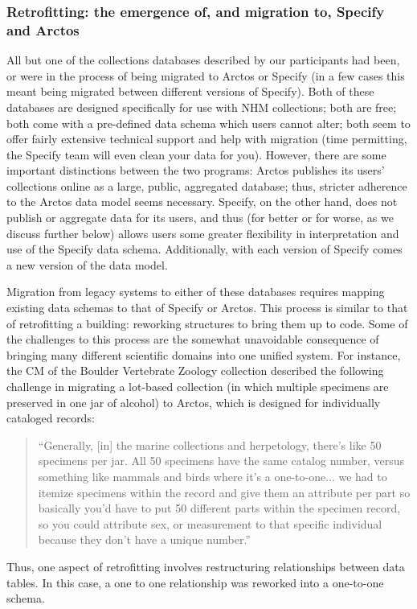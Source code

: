 \subsubsection{Retrofitting: the emergence of, and migration to, Specify and Arctos}

All but one of the collections databases described by our participants had been, or were in the process of being migrated to Arctos or Specify (in a few cases this meant being migrated between different versions of Specify). Both of these databases are designed specifically for use with NHM collections; both are free; both come with a pre-defined data schema which users cannot alter; both seem to offer fairly extensive technical support and help with migration (time permitting, the Specify team will even clean your data for you). However, there are some important distinctions between the two programs: Arctos publishes its users’ collections online as a large, public, aggregated database; thus, stricter adherence to the Arctos data model seems necessary. Specify, on the other hand, does not publish or aggregate data for its users, and thus (for better or for worse, as we discuss further below) allows users some greater flexibility in interpretation and use of the Specify data schema. Additionally, with each version of Specify comes a new version of the data model.

Migration from legacy systems to either of these databases requires mapping existing data schemas to that of Specify or Arctos. This process is similar to that of retrofitting a building: reworking structures to bring them up to code. Some of the challenges to this process are the somewhat unavoidable consequence of bringing many different scientific domains into one unified system. For instance, the CM of the Boulder Vertebrate Zoology collection described the following challenge in migrating a lot-based collection (in which multiple specimens are preserved in one jar of alcohol) to Arctos, which is designed for individually cataloged records:
\begin{quote}
“Generally, [in] the marine collections and herpetology, there's like 50 specimens per jar. All 50 specimens have the same catalog number, versus something like mammals and birds where it's a one-to-one... we had to itemize specimens within the record and give them an attribute per part so basically you'd have to put 50 different parts within the specimen record, so you could attribute sex, or measurement to that specific individual because they don't have a unique number.”
\end{quote}
Thus, one aspect of retrofitting involves restructuring relationships between data tables.  In this case, a one to one relationship was reworked into a one-to-one schema.

